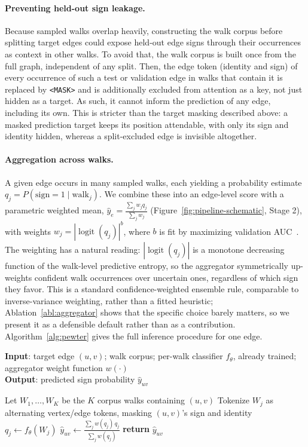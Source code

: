 \documentclass[sigconf]{acmart}
\theoremstyle{plain}
\theoremstyle{definition}
\begin{document}
\paragraph{Preventing held-out sign leakage.} Because sampled walks overlap heavily, constructing the walk corpus before splitting target edges could expose held-out edge signs through their occurrences as context in other walks. To avoid that,  the walk corpus is built once from the full graph, independent of any split. Then, the edge token (identity and sign) of every occurrence of such a test or validation edge in walks that contain it is replaced by \texttt{<MASK>} and is additionally excluded from attention as a key, not just hidden as a target. As such, it cannot inform the prediction of any edge, including its own. This is stricter than the target masking described above: a masked prediction target keeps its position attendable, with only its sign and identity hidden, whereas a split-excluded edge is invisible altogether.

\paragraph{Aggregation across walks.} A given edge occurs in many sampled walks, each yielding a probability estimate $q_j=P(\text{sign}=1\mid \text{walk}_j)$. We combine these into an edge-level score with a parametric weighted mean, $\hat{y}_e = \frac{\sum_j w_j q_j}{\sum_j w_j}$ (Figure~\ref{fig:pipeline-schematic}, Stage 2), with weights $w_j = |\operatorname{logit}(q_j)|^{b}$, where $b$ is fit by maximizing validation AUC~\citep{nelder1965simplex}. The weighting has a natural reading: $|\operatorname{logit}(q_j)|$ is a monotone decreasing function of the walk-level predictive entropy, so the aggregator symmetrically up-weights confident walk occurrences over uncertain ones, regardless of which sign they favor. This is a standard confidence-weighted ensemble rule, comparable to inverse-variance weighting, rather than a fitted heuristic; Ablation~\ref{abl:aggregator} shows that the specific choice barely matters, so we present it as a defensible default rather than as a contribution. Algorithm~\ref{alg:pewter} gives the full inference procedure for one edge.

\begin{algorithm}[tb]
\caption{Pewter: inference for edge $(u,v)$}
\label{alg:pewter}
\textbf{Input}: target edge $(u,v)$; walk corpus; per-walk classifier $f_\theta$, already trained; aggregator weight function $w(\cdot)$\\
\textbf{Output}: predicted sign probability $\hat y_{uv}$
\begin{algorithmic}[1]
\STATE Let $W_1,\ldots,W_K$ be the $K$ corpus walks containing $(u,v)$
  \STATE Tokenize $W_j$ as alternating vertex/edge tokens, masking $(u,v)$'s sign and identity
  \STATE $q_j \gets f_\theta(W_j)$ 
\ENDFOR
\STATE $\hat y_{uv} \gets \frac{\sum_j w(q_j)\, q_j}{\sum_j w(q_j)}$
\STATE \textbf{return} $\hat y_{uv}$
\end{algorithmic}
\end{algorithm}
\end{document}
